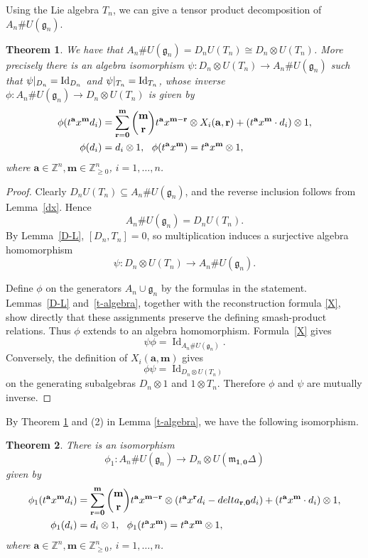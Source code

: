 \documentclass[12pt,a4paper]{amsart}
\def\mg{g}%
\def\delta{delta}%
\newtheorem{theorem}{Theorem}[section]
\numberwithin{equation}{section}
\newcommand{\Z}{\mathbb{Z}}
\def\mg{\mathfrak{g}}
\def\mm{\mathfrak{m}}
\def\ba{\mathbf{a}}
\def\br{\mathbf{r}}
\def\bm{\mathbf{m}}
\def\b1{\mathbf{1}}
\def\bo{\mathbf{0}}
\begin{document}
Using the Lie algebra $T_n$, we  can give a tensor product decomposition
of $A_n\#U(\mg_n)$.


\begin{theorem}\label{mainth}
We have that $A_n\#U(\mg_n)=D_n U(T_n)\cong D_n\otimes U(T_n)$.
More precisely there is an
algebra isomorphism $\psi: D_n \otimes U(T_n)\rightarrow A_n\#U(\mg_n)$
such that $\psi |_{D_n}=\textup{Id}_{D_n}$ and $\psi |_{T_n}=\textup{Id}_{T_n}$,
whose inverse \(\phi:A_n\#U(\mg_n)\rightarrow D_n\otimes U(T_n)\)
is given by
$$\aligned\phi(t^{\ba}x^{\bm}d_{i})&=
\sum_{\br= \bo}^{\bm}\binom{\bm}{\br} t^{\ba}x^{\bm-\br} \otimes X_i(\ba,\br)+ (t^{\ba}x^{\bm}\cdot d_{i})\otimes 1, \\
\phi(d_i)&= d_i\otimes 1,\ \
\phi(t^{\ba}x^{\bm})=t^{\ba}x^{\bm}\otimes 1,\endaligned$$  where $\ba\in \Z^n, \bm\in\Z_{\geq 0}^n$, $i=1,\dots,n$.
\end{theorem}

\begin{proof}
Clearly \(D_nU(T_n)\subseteq A_n\#U(\mg_n)\), and the reverse
inclusion follows from Lemma~\ref{dx}. Hence
\[
A_n\#U(\mg_n)=D_nU(T_n).
\]
By Lemma~\ref{D-L}, \([D_n,T_n]=0\), so multiplication induces a
surjective algebra homomorphism
\[
\psi\colon D_n\otimes U(T_n)\longrightarrow A_n\#U(\mg_n).
\]

Define \(\phi\) on the generators \(A_n\cup\mg_n\) by the formulas in
the statement. Lemmas~\ref{D-L} and~\ref{t-algebra}, together with
the reconstruction formula \eqref{X}, show directly that these
assignments preserve the defining smash-product relations. Thus
\(\phi\) extends to an algebra homomorphism. Formula~\eqref{X} gives
\[
\psi\phi=\operatorname{Id}_{A_n\#U(\mg_n)}.
\]
Conversely, the definition of \(X_i(\ba,\bm)\) gives
\[
\phi\psi=\operatorname{Id}_{D_n\otimes U(T_n)}
\]
on the generating subalgebras \(D_n\otimes1\) and \(1\otimes T_n\).
Therefore \(\phi\) and \(\psi\) are mutually inverse.
\end{proof}

By Theorem \ref{mainth} and (2) in Lemma \ref{t-algebra}, we have the following isomorphism.

\begin{theorem}\label{mainth1}
There is an isomorphism
$$\phi_1:A_n\#U(\mg_n)\rightarrow D_n\otimes U(\mm_{\b1,\bo}\Delta)
$$
given by
$$\aligned\phi_1(t^{\ba}x^{\bm}d_{i})&=
\sum_{\br= \bo}^{\bm}\binom{\bm}{\br} t^{\ba}x^{\bm-\br} \otimes (t^{\ba}x^{\br}d_{i} -\delta_{\br,\bo}d_i)+ (t^{\ba}x^{\bm}\cdot d_{i})\otimes 1, \\
\phi_1(d_i)&= d_i\otimes 1,\ \
\phi_1(t^{\ba}x^{\bm})=t^{\ba}x^{\bm}\otimes 1,\endaligned$$  where $\ba\in \Z^n, \bm\in\Z_{\geq 0}^n$, $i=1,\dots,n$.
\end{theorem}
\end{document}
